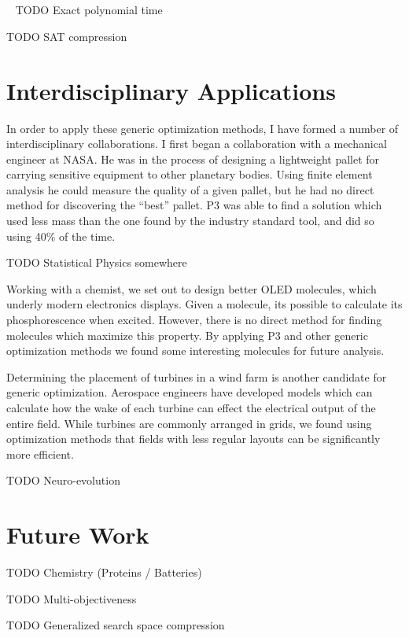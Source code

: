 \documentclass[a4paper, 11pt]{article}
\begin{document}
~\cite{goldman:2015:GBO}

~\cite{goldman:2016:hyperplane}

~\cite{whitley:2016:mkl}
TODO Exact polynomial time

TODO SAT compression

\section{Interdisciplinary Applications}
In order to apply these generic optimization methods, I have formed a number of
interdisciplinary collaborations. I first began a collaboration with a mechanical engineer
at NASA. He was in the process of designing a lightweight pallet for carrying sensitive
equipment to other planetary bodies. Using finite element analysis he could measure
the quality of a given pallet, but he had no direct method for discovering the ``best'' pallet.
P3 was able to find a solution which used less mass than the one found by the industry standard
tool, and did so using 40\% of the time.

TODO Statistical Physics somewhere

Working with a chemist, we set out to
design better OLED molecules, which underly modern electronics displays.
Given a molecule, its possible to calculate its phosphorescence when excited. However,
there is no direct method for finding molecules which maximize this property.
By applying P3 and other generic optimization methods we found some interesting
molecules for future analysis.

Determining the placement of turbines in a wind farm is another candidate for
generic optimization. Aerospace engineers have developed models which can calculate
how the wake of each turbine can effect the electrical output of the entire field.
While turbines are commonly arranged in grids, we found using optimization methods
that fields with less regular layouts can be significantly more efficient.

TODO Neuro-evolution

\section{Future Work}
TODO Chemistry (Proteins / Batteries)

TODO Multi-objectiveness

TODO Generalized search space compression



\small



\end{document}
